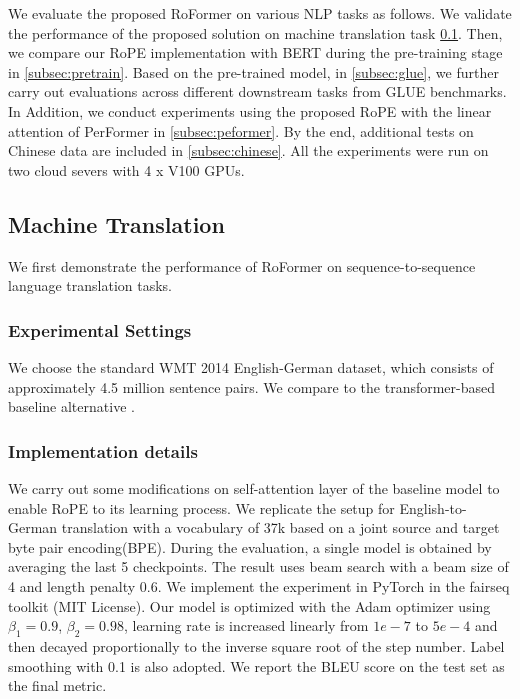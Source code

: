 We evaluate the proposed RoFormer on various NLP tasks as follows. We validate the performance of the proposed solution on machine translation task \ref{subsec:mt}. Then, we compare our RoPE implementation with BERT\cite{Devlin2019BERTPO} during the pre-training stage in \ref{subsec:pretrain}. Based on the pre-trained model, in \ref{subsec:glue}, we further carry out evaluations across different downstream tasks from GLUE benchmarks\cite{glue}. In Addition, we conduct experiments using the proposed RoPE with the linear attention of PerFormer \cite{performer} in \ref{subsec:peformer}. By the end, additional tests on Chinese data are included in \ref{subsec:chinese}. All the experiments were run on two cloud severs with 4 x V100 GPUs.

\subsection{Machine Translation}\label{subsec:mt}
We first demonstrate the performance of RoFormer on sequence-to-sequence language translation tasks. 
\subsubsection{Experimental Settings} We choose the standard WMT 2014 English-German dataset\cite{mtdataset}, which consists of approximately 4.5 million sentence pairs. We compare to the transformer-based baseline alternative \cite{Vaswani:2017}. 
\subsubsection{Implementation details} We carry out some modifications on  self-attention layer of the baseline model \cite{Vaswani:2017} to enable RoPE to its learning process. We replicate the setup for English-to-German translation with a vocabulary of 37k based on a joint source and target byte pair encoding(BPE)\cite{bpe}. During the evaluation, a single model is obtained by averaging the last 5 checkpoints. The result uses beam search with a beam size of 4 and length penalty 0.6.  We implement the experiment in PyTorch in the fairseq toolkit (MIT License)\cite{fairseq}.  Our model is optimized with the Adam optimizer using $\beta_1 = 0.9$, $\beta_2 = 0.98$, learning rate is increased linearly from $1e-7$ to $5e-4$ and then decayed proportionally to the inverse square root of the step number. Label smoothing with 0.1 is also adopted. We report the BLEU\cite{bleu} score on the test set as the final metric.


